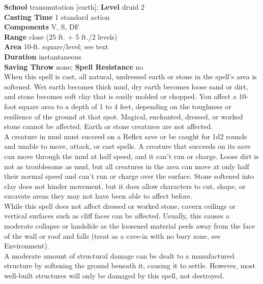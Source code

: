 \textbf{School} transmutation [earth]; \textbf{Level} druid 2\\
\textbf{Casting Time} 1 standard action\\
\textbf{Components} V, S, DF\\
\textbf{Range} close (25 ft. + 5 ft./2 levels)\\
\textbf{Area} 10-ft. square/level; see text\\
\textbf{Duration} instantaneous\\
\textbf{Saving Throw} none; \textbf{Spell Resistance} no\\
When this spell is cast, all natural, undressed earth or stone in the spell's area is softened. Wet earth becomes thick mud, dry earth becomes loose sand or dirt, and stone becomes soft clay that is easily molded or chopped. You affect a 10-foot square area to a depth of 1 to 4 feet, depending on the toughness or resilience of the ground at that spot. Magical, enchanted, dressed, or worked stone cannot be affected. Earth or stone creatures are not affected.\\
A creature in mud must succeed on a Reflex save or be caught for 1d2 rounds and unable to move, attack, or cast spells. A creature that succeeds on its save can move through the mud at half speed, and it can't run or charge. Loose dirt is not as troublesome as mud, but all creatures in the area can move at only half their normal speed and can't run or charge over the surface. Stone softened into clay does not hinder movement, but it does allow characters to cut, shape, or excavate areas they may not have been able to affect before.\\
While this spell does not affect dressed or worked stone, cavern ceilings or vertical surfaces such as cliff faces can be affected. Usually, this causes a moderate collapse or landslide as the loosened material peels away from the face of the wall or roof and falls (treat as a cave-in with no bury zone, see Environment).\\
A moderate amount of structural damage can be dealt to a manufactured structure by softening the ground beneath it, causing it to settle. However, most well-built structures will only be damaged by this spell, not destroyed.\\
